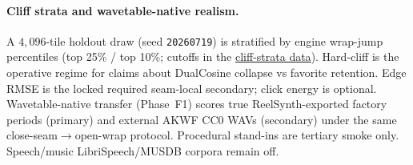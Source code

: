 \paragraph{Cliff strata and wavetable-native realism.}
A $4{,}096$-tile holdout draw (seed \texttt{20260719}) is stratified by engine wrap-jump percentiles (top 25\% / top 10\%; cutoffs in the \href{https://github.com/reeldemo/denoise-opt-meta/blob/master/paper/Unsupervised_Wavetable_Seam_Artifact_Repair_via_Hybrid_GA-PPO_Meta-Search_v10/figures/cliff_strata.json}{cliff-strata data}).
Hard-cliff is the operative regime for claims about DualCosine collapse vs favorite retention.
Edge RMSE is the locked required seam-local secondary; click energy is optional.
Wavetable-native transfer (Phase~F1) scores true ReelSynth-exported factory periods (primary) and external AKWF CC0 WAVs (secondary) under the same close-seam$\to$open-wrap protocol.
Procedural stand-ins are tertiary smoke only.
Speech/music LibriSpeech/MUSDB corpora remain off.


